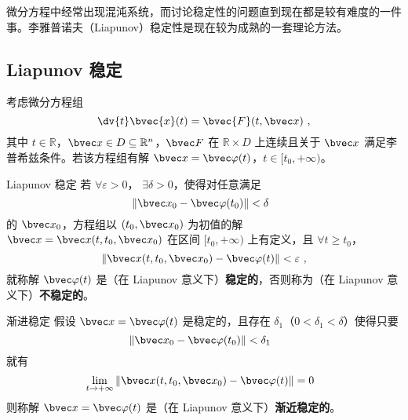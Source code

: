 
\begin{issues}
\issueMissDepend
\end{issues}

微分方程中经常出现混沌系统，而讨论稳定性的问题直到现在都是较有难度的一件事。李雅普诺夫（Liapunov）稳定性是现在较为成熟的一套理论方法。

\subsection{Liapunov 稳定}
考虑微分方程组 
\begin{equation}
\dv{t} \bvec{x}(t) = \bvec{F}(t, \bvec x) ~,
\end{equation}
其中 $t \in \mathbb R$，$\bvec x \in D \subseteq \mathbb R^n$，$\bvec F$ 在 $\mathbb R \times D$ 上连续且关于 $\bvec x$ 满足李普希兹条件。若该方程组有解 $\bvec x = \bvec \varphi(t)$，$t \in [t_0, +\infty)$。

\begin{definition}{Liapunov 稳定}
若 $\forall \varepsilon > 0$， $\exists \delta > 0$，使得对任意满足 
\begin{equation}
\Vert \bvec x_0 - \bvec \varphi(t_0)\Vert < \delta ~~
\end{equation}
的 $\bvec x_0$，方程组以 $(t_0, \bvec x_0)$ 为初值的解 $\bvec x= \bvec x(t, t_0, \bvec x_0)$ 在区间 $[t_0, +\infty)$ 上有定义，且 $\forall t \ge t_0$，
\begin{equation}
\Vert  \bvec x(t, t_0, \bvec x_0) - \bvec \varphi(t) \Vert < \varepsilon ~,
\end{equation}
就称解 $\bvec \varphi(t)$ 是（在 Liapunov 意义下）\textbf{稳定的}，否则称为（在 Liapunov 意义下）\textbf{不稳定的}。

\end{definition}

\begin{definition}{渐进稳定}
假设 $\bvec x = \bvec \varphi(t)$ 是稳定的，且存在 $\delta_1$（$0 < \delta_1 < \delta$）使得只要
\begin{equation}
\Vert \bvec x_0 - \bvec \varphi(t_0) \Vert < \delta_1 ~~
\end{equation}
就有
\begin{equation}
\lim_{t \to +\infty} \Vert  \bvec x(t, t_0, \bvec x_0) - \bvec \varphi(t) \Vert = 0 ~~
\end{equation}
则称解 $\bvec x = \bvec \varphi(t)$ 是（在 Liapunov 意义下）\textbf{渐近稳定的}。

\end{definition}


